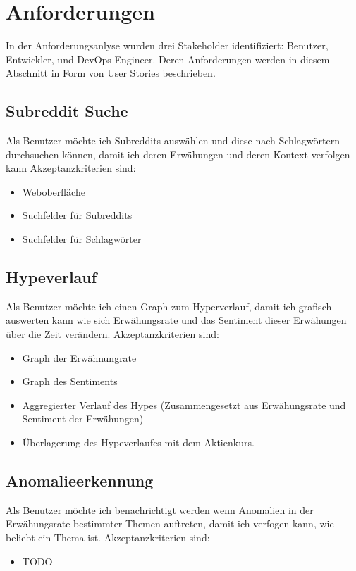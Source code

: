 \documentclass[a4paper, 10pt, conference]{ieeeconf}
\begin{document}
\section{Anforderungen} \label{s:anforderungen}

In der Anforderungsanlyse wurden drei Stakeholder identifiziert: Benutzer, Entwickler, und DevOps Engineer.  Deren Anforderungen werden in diesem Abschnitt in Form von User Stories beschrieben. 

\subsection{Subreddit Suche}

Als Benutzer möchte ich Subreddits auswählen und diese nach Schlagwörtern durchsuchen können,  damit ich deren Erwähungen und deren Kontext verfolgen kann  Akzeptanzkriterien sind:
\begin{itemize}
\item Weboberfläche 
\item Suchfelder für Subreddits
\item Suchfelder für Schlagwörter
\end{itemize}

\subsection{Hypeverlauf}

Als Benutzer möchte ich einen Graph zum Hyperverlauf,  damit ich grafisch auswerten kann wie sich Erwähungsrate und das Sentiment dieser Erwähungen über die Zeit verändern.  Akzeptanzkriterien sind:
\begin{itemize}
\item Graph der Erwähnungrate
\item Graph des Sentiments
\item Aggregierter Verlauf des Hypes (Zusammengesetzt aus Erwähungsrate und Sentiment der Erwähungen)
\item Überlagerung des Hypeverlaufes mit dem Aktienkurs.
\end{itemize}

\subsection{Anomalieerkennung}

Als Benutzer möchte ich benachrichtigt werden wenn Anomalien in der Erwähungsrate bestimmter Themen auftreten,  damit ich verfogen kann, wie beliebt ein Thema ist.  Akzeptanzkriterien sind:
\begin{itemize}
\item TODO
\end{itemize}
\end{document}
